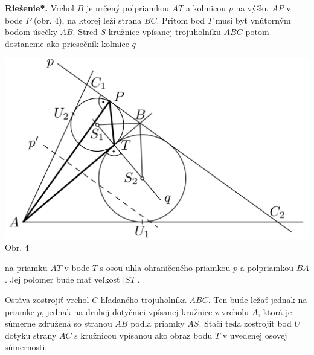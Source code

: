 \documentclass[11pt,a4paper,oneside,final]{book}
\newcommand{\rieh}{\textbf{Riešenie*.} }
\begin{document}
\rieh Vrchol $B$ je určený polpriamkou $AT$ a kolmicou $p$ na výšku $AP$ v bode $P$ (obr. 4), na ktorej leží strana $BC$. Pritom bod $T$ musí byť vnútorným bodom úsečky $AB$. Stred $S$ kružnice vpísanej trojuholníku $ABC$ potom dostaneme ako priesečník kolmice $q$
\begin{center}
\includegraphics[scale=0.3]{63D2}\\

Obr. 4
\end{center}
na priamku $AT$ v bode $T$ s osou uhla ohraničeného priamkou $p$ a polpriamkou $BA$. Jej polomer bude mať veľkosť $|ST|$.

Ostáva zostrojiť vrchol $C$ hľadaného trojuholníka $ABC$. Ten bude ležať jednak na priamke $p$, jednak na druhej dotyčnici vpísanej kružnice z vrcholu $A$, ktorá je súmerne združená so stranou $AB$ podľa priamky $AS$. Stačí teda zostrojiť bod $U$ dotyku strany $AC$ s kružnicou vpísanou ako obraz bodu $T$ v uvedenej osovej súmernosti.
\end{document}
